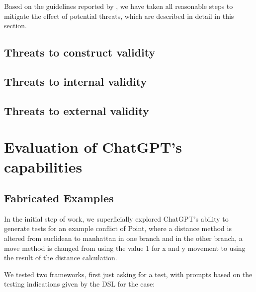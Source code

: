 
Based on the guidelines reported by \citet{wohlin2012experimentation}, we have
taken all reasonable steps to mitigate the effect of potential threats, which
are described in detail in this section.

\subsection{Threats to construct validity}
%

\subsection{Threats to internal validity}
%

\subsection{Threats to external validity}
%





\section{Evaluation of ChatGPT's capabilities}

\subsection{Fabricated Examples}

In the initial step of work, we superficially explored ChatGPT's ability to generate tests for an example conflict of Point, where a distance method is altered from euclidean to manhattan in one branch and in the other branch, a move method is changed from using the value 1 for x and y movement to using the result of the distance calculation.

We tested two frameworks, first just asking for a test, with prompts based on the testing indications given by the DSL for the case:

